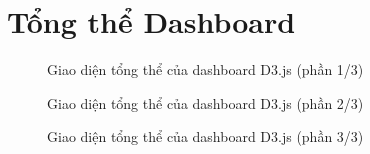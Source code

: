 \section{Tổng thể Dashboard}
\clearpage
\begin{figure}[p]
    \centering
    \caption{Giao diện tổng thể của dashboard D3.js (phần 1/3)}
    \label{fig:dashboard-overview}
\end{figure}
\clearpage

\begin{figure}[p]
    \centering
    \caption*{Giao diện tổng thể của dashboard D3.js (phần 2/3)}
\end{figure}
\clearpage

\begin{figure}[p]
    \centering
    \caption*{Giao diện tổng thể của dashboard D3.js (phần 3/3)}
\end{figure}
\clearpage
